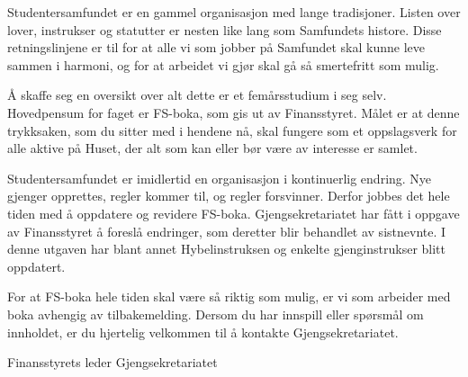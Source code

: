 \documentclass[fsbok.tex]{subfiles}
\begin{document}
\begin{forord}
Studentersamfundet er en gammel organisasjon med lange tradisjoner. Listen over lover, instrukser og statutter er
nesten like lang som Samfundets histore. Disse retningslinjene er til for at alle vi som jobber på Samfundet skal kunne
leve sammen i harmoni, og for at arbeidet vi gjør skal gå så smertefritt som mulig.

Å skaffe seg en oversikt over alt dette er et femårsstudium i seg selv. Hovedpensum for faget er FS-boka, som gis ut
av Finansstyret. Målet er at denne trykksaken, som du sitter med i hendene nå, skal fungere som et oppslagsverk for
alle aktive på Huset, der alt som kan eller bør være av interesse er samlet.

Studentersamfundet er imidlertid en organisasjon i kontinuerlig endring. Nye gjenger opprettes, regler kommer til, og
regler forsvinner. Derfor jobbes det hele tiden med å oppdatere og revidere FS-boka. Gjengsekretariatet har fått i
oppgave av Finansstyret å foreslå endringer, som deretter blir behandlet av sistnevnte. I denne utgaven har blant annet
Hybelinstruksen og enkelte gjenginstrukser blitt oppdatert.

For at FS-boka hele tiden skal være så riktig som mulig, er vi som arbeider med boka avhengig av tilbakemelding.
Dersom du har innspill eller spørsmål om innholdet, er du hjertelig velkommen til å kontakte Gjengsekretariatet.



\vfill


Finansstyrets leder \hfill Gjengsekretariatet


\end{forord}
\end{document}
